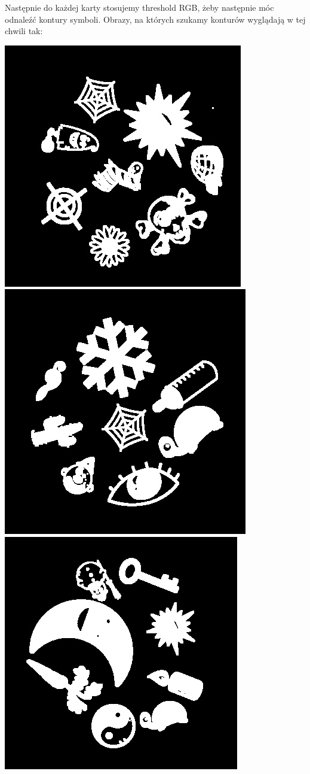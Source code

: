 \documentclass[10pt,a4paper]{article}
\begin{document}
\newpage
Następnie do każdej karty stosujemy threshold RGB, żeby następnie móc odnaleźć kontury symboli. Obrazy, na których szukamy konturów wyglądają w tej chwili tak:\\
\begin{center}
\includegraphics[scale=0.25]{2.1/0.jpg}
\includegraphics[scale=0.25]{2.1/1.jpg}
\includegraphics[scale=0.25]{2.1/2.jpg}

\end{center}
\end{document}
